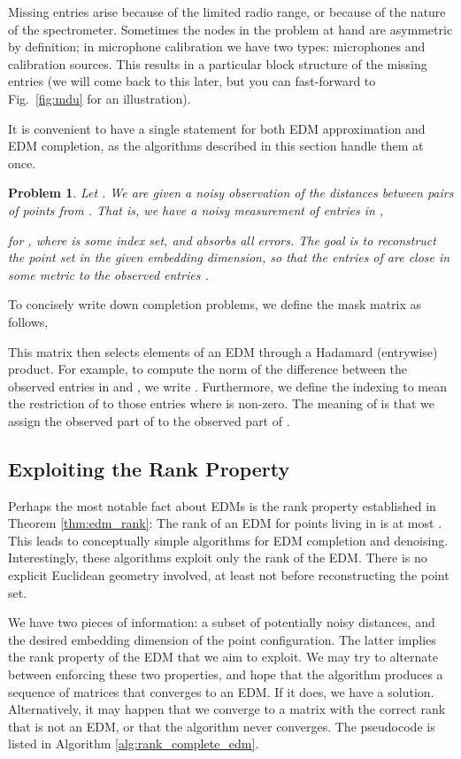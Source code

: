 \documentclass[10pt,double]{IEEEtran}
\newtheorem{problem}{Problem}
\begin{document}
Missing entries arise because of the limited radio range, or because of the
nature of the spectrometer. Sometimes the nodes in the problem at hand are
asymmetric by definition; in microphone calibration we have two types:
microphones and calibration sources. This results in a particular block
structure of the missing entries (we will come back to this later, but you can
fast-forward to Fig.~\ref{fig:mdu} for an illustration).

It is convenient to have a single statement for both EDM approximation and EDM
completion, as the algorithms described in this section handle them at once.

\begin{problem}
\label{prob:approximation_completion}
Let . We are given a noisy observation of the distances
between  pairs of points from . That is, we have a
noisy measurement of  entries in ,

for , where  is some index set, and  absorbs
all errors. The goal is to reconstruct the point set  in the given
embedding dimension, so that the entries of  are close in some
metric to the observed entries .
\end{problem}

To concisely write down completion problems, we define the mask matrix 
as follows,

This matrix then selects elements of an EDM through a Hadamard (entrywise)
product. For example, to compute the norm of the difference between the
observed entries in  and , we write .
Furthermore, we define the indexing  to mean the restriction of
 to those entries where  is non-zero. The meaning of  is that we assign the observed part of  to the observed
part of .

\subsection{Exploiting the Rank Property} \label{sub:exploiting_the_rank_property}

Perhaps the most notable fact about EDMs is the rank property established in
Theorem \ref{thm:edm_rank}: The rank of an EDM for points living in  is
at most . This leads to conceptually simple algorithms for EDM completion
and denoising. Interestingly, these algorithms exploit only the rank of the
EDM. There is no explicit Euclidean geometry involved, at least not before
reconstructing the point set.

We have two pieces of information: a subset of potentially noisy distances,
and the desired embedding dimension of the point configuration. The latter
implies the rank property of the EDM that we aim to exploit. We may try to
alternate between enforcing these two properties, and hope that the algorithm
produces a sequence of matrices that converges to an EDM. If it does, we have
a solution. Alternatively, it may happen that we converge to a matrix with the
correct rank that is not an EDM, or that the algorithm never converges. The
pseudocode is listed in Algorithm \ref{alg:rank_complete_edm}.
\end{document}
